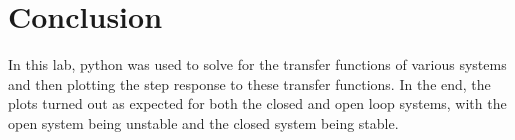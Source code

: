 \documentclass[12pt]{report}
\begin{document}
\section{Conclusion}
In this lab, python was used to solve for the transfer functions of various systems and then plotting the step response to these transfer functions. In the end, the plots turned out as expected for both the closed and open loop systems, with the open system being unstable and the closed system being stable. 
\end{document}
